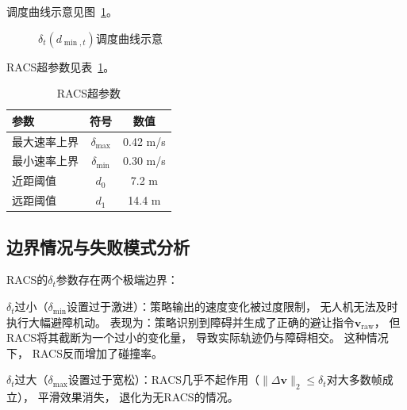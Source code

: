 调度曲线示意见图~\ref{fig:delta_schedule}。
\begin{figure}[htbp]
\centering
{}
\caption{$\delta_t(d_{\min,t})$调度曲线示意}
\label{fig:delta_schedule}
\end{figure}

RACS超参数见表~\ref{tab:racs_params}。

\begin{table}[htbp]
\centering
\caption{RACS超参数}
\label{tab:racs_params}
\begin{tabular}{lcc}
\toprule
\textbf{参数} & \textbf{符号} & \textbf{数值} \\
\midrule
最大速率上界 & $\delta_{\max}$ & 0.42 m/s \\
最小速率上界 & $\delta_{\min}$ & 0.30 m/s \\
近距阈值 & $d_0$ & 7.2 m \\
远距阈值 & $d_1$ & 14.4 m \\
\bottomrule
\end{tabular}
\end{table}


\subsection{边界情况与失败模式分析}

RACS的$\delta_t$参数存在两个极端边界：

$\delta_t$过小（$\delta_{\min}$设置过于激进）：策略输出的速度变化被过度限制，
无人机无法及时执行大幅避障机动。
表现为：策略识别到障碍并生成了正确的避让指令$\mathbf{v}_{\text{raw}}$，
但RACS将其截断为一个过小的变化量，
导致实际轨迹仍与障碍相交。
这种情况下，
RACS反而增加了碰撞率。

$\delta_t$过大（$\delta_{\max}$设置过于宽松）：RACS几乎不起作用（$\|\Delta \mathbf{v}\|_2 \leq \delta_t$对大多数帧成立），
平滑效果消失，
退化为无RACS的情况。

